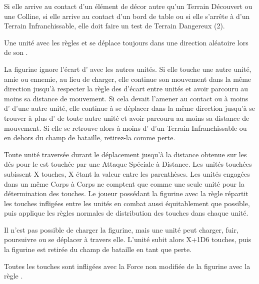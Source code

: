 Si elle arrive au contact d'un élément de décor autre qu'un Terrain Découvert ou une Colline, si elle arrive au contact d'un bord de table ou si elle s'arrête à  d'un Terrain Infranchissable, elle doit faire un test de Terrain Dangereux (2).

\armyspecialruleentry{\runningamok}

Une unité avec les règles \shambolic{} et \runningamok{} se déplace toujours dans une direction aléatoire lors de son \randommovement{}.


La figurine ignore l'écart d' avec les autres unités. Si elle touche une autre unité, amie ou ennemie, au lieu de charger, elle continue son mouvement dans la même direction jusqu'à respecter la règle des  d'écart entre unités et avoir parcouru au moins sa distance de mouvement. Si cela devait l'amener au contact ou à moins d' d'une autre unité, elle continue à se déplacer dans la même direction jusqu'à se trouver à plus d' de toute autre unité et avoir parcouru au moins sa distance de mouvement. Si elle se retrouve alors à moins d' d'un Terrain Infranchissable ou en dehors du champ de bataille, retirez-la comme perte.

Toute unité traversée durant le déplacement jusqu'à la distance obtenue sur les dés pour le \randommovement{} est touchée par une Attaque Spéciale à Distance. Les unités touchées subissent X touches, X étant la valeur entre les parenthèses. Les unités engagées dans un même Corps à Corps ne comptent que comme une seule unité pour la détermination des touches. Le joueur possédant la figurine avec la règle \ricochet{} répartit les touches infligées entre les unités en combat aussi équitablement que possible, puis applique les règles normales de distribution des touches dans chaque unité.

Il n'est pas possible de charger la figurine, mais une unité peut charger, fuir, poursuivre ou se déplacer à travers elle. L'unité subit alors X+1D6 touches, puis la figurine est retirée du champ de bataille en tant que perte.

Toutes les touches sont infligées avec la Force non modifiée de la figurine avec la règle .

